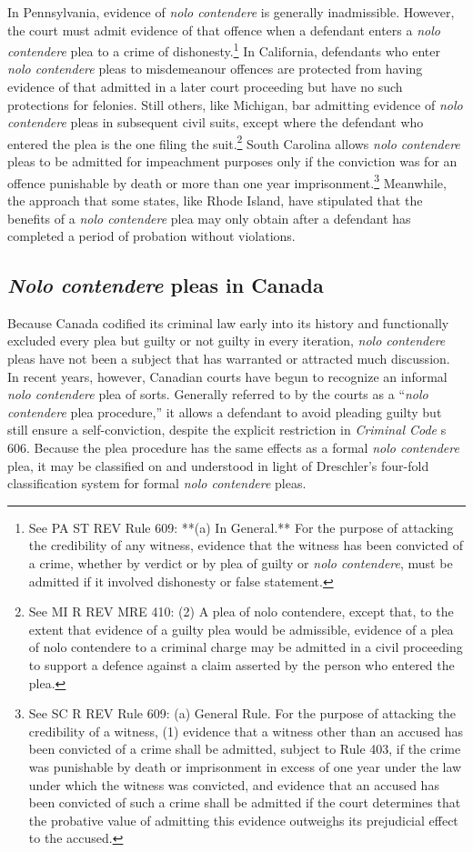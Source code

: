 In Pennsylvania, evidence of \textit{nolo contendere} is generally inadmissible. However, the court must admit evidence of that offence when a defendant enters a \textit{nolo contendere} plea to a crime of dishonesty.\footnote{See PA ST REV Rule 609: **(a) In General.** For the purpose of attacking the credibility of any witness, evidence that the witness has been convicted of a crime, whether by verdict or by plea of guilty or \textit{nolo contendere}, must be admitted if it involved dishonesty or false statement.} In California, defendants who enter \textit{nolo contendere} pleas to misdemeanour offences are protected from having evidence of that admitted in a later court proceeding but have no such protections for felonies. Still others, like Michigan, bar admitting evidence of \textit{nolo contendere} pleas in subsequent civil suits, except where the defendant who entered the plea is the one filing the suit.\footnote{See MI R REV MRE 410: (2) A plea of nolo contendere, except that, to the extent that evidence of a guilty plea would be admissible, evidence of a plea of nolo contendere to a criminal charge may be admitted in a civil proceeding to support a defence against a claim asserted by the person who entered the plea.} South Carolina allows \textit{nolo contendere} pleas to be admitted for impeachment purposes only if the conviction was for an offence punishable by death or more than one year imprisonment.\footnote{See SC R REV Rule 609: (a) General Rule. For the purpose of attacking the credibility of a witness, (1) evidence that a witness other than an accused has been convicted of a crime shall be admitted, subject to Rule 403, if the crime was punishable by death or imprisonment in excess of one year under the law under which the witness was convicted, and evidence that an accused has been convicted of such a crime shall be admitted if the court determines that the probative value of admitting this evidence outweighs its prejudicial effect to the accused.} Meanwhile, the approach that some states, like Rhode Island, have stipulated that the benefits of a \textit{nolo contendere} plea may only obtain after a defendant has completed a period of probation without violations.

\subsection{\textit{Nolo contendere} pleas in Canada}

Because Canada codified its criminal law early into its history and functionally excluded every plea but guilty or not guilty in every iteration, \textit{nolo contendere} pleas have not been a subject that has warranted or attracted much discussion. In recent years, however, Canadian courts have begun to recognize an informal \textit{nolo contendere} plea of sorts. Generally referred to by the courts as a ``\textit{nolo contendere} plea procedure,'' it allows a defendant to avoid pleading guilty but still ensure a self-conviction, despite the explicit restriction in \textit{Criminal Code} s 606. Because the plea procedure has the same effects as a formal \textit{nolo contendere} plea, it may be classified on and understood in light of Dreschler's four-fold classification system for formal \textit{nolo contendere} pleas.

